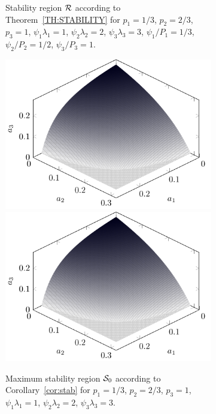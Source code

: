 \begin{figure}
\begin{subfigure}[t]{.45\textwidth}
    \fi
    \caption{Stability region $\cal{R}$ according to Theorem~\ref{TH:STABILITY} for $p_1 = 1/3$, $p_2 = 2/3$, $p_3 = 1$, $\psi_1\lambda_1=1$, $\psi_2\lambda_2=2$, $\psi_3\lambda_3=3$, $\psi_1/P_1 = 1/3$, $\psi_2/P_2 = 1/2$, $\psi_3/P_3= 1$.}
\label{fig:ThStab}
\end{subfigure}%
\begin{subfigure}{.05\textwidth}
\hspace{.05\textwidth}
\end{subfigure}%
\begin{subfigure}[t]{.45\textwidth}
  \centering
    \if{}
        \includegraphics[width=\textwidth]{Figures/Ch7_corollary_stab.pdf}
    \else
        \includegraphics[draft,width=\textwidth]{Figures/Ch7_corollary_stab.pdf}
    \fi
    \caption{Maximum stability region $\cal{S}_0$ according to Corollary~\ref{cor:stab} for $p_1 = 1/3$, $p_2 = 2/3$, $p_3 = 1$,  $\psi_1\lambda_1=1$, $\psi_2\lambda_2=2$, $\psi_3\lambda_3=3$.}
\label{fig:CorStab}
\end{subfigure}
\caption{}
\end{figure}

